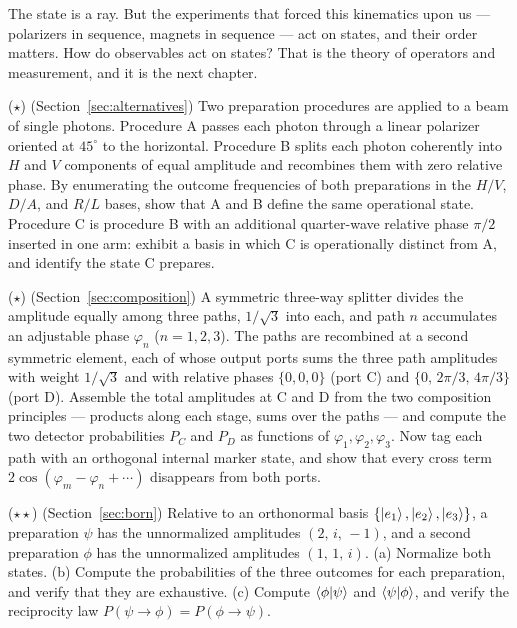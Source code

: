 The state is a ray. But the experiments that forced this kinematics upon us --- polarizers in sequence, magnets in sequence --- act on states, and their order matters. How do observables act on states? That is the theory of operators and measurement, and it is the next chapter.

\begin{problemset}
\item ($\star$) (Section~\ref{sec:alternatives}) Two preparation procedures are applied to a beam of single photons. Procedure A passes each photon through a linear polarizer oriented at $45^{\circ}$ to the horizontal. Procedure B splits each photon coherently into $H$ and $V$ components of equal amplitude and recombines them with zero relative phase. By enumerating the outcome frequencies of both preparations in the $H/V$, $D/A$, and $R/L$ bases, show that A and B define the same operational state. Procedure C is procedure B with an additional quarter-wave relative phase $\pi/2$ inserted in one arm: exhibit a basis in which C is operationally distinct from A, and identify the state C prepares.

\item ($\star$) (Section~\ref{sec:composition}) A symmetric three-way splitter divides the amplitude equally among three paths, $1/\sqrt{3}$ into each, and path $n$ accumulates an adjustable phase $\varphi_n$ ($n=1,2,3$). The paths are recombined at a second symmetric element, each of whose output ports sums the three path amplitudes with weight $1/\sqrt{3}$ and with relative phases $\{0,0,0\}$ (port C) and $\{0,\,2\pi/3,\,4\pi/3\}$ (port D). Assemble the total amplitudes at C and D from the two composition principles --- products along each stage, sums over the paths --- and compute the two detector probabilities $P_C$ and $P_D$ as functions of $\varphi_1,\varphi_2,\varphi_3$. Now tag each path with an orthogonal internal marker state, and show that every cross term $2\cos(\varphi_m-\varphi_n+\cdots)$ disappears from both ports.

\item ($\star\star$) (Section~\ref{sec:born}) Relative to an orthonormal basis $\{\ket{e_1},\ket{e_2},\ket{e_3}\}$, a preparation $\psi$ has the unnormalized amplitudes $(2,\,i,\,-1)$, and a second preparation $\phi$ has the unnormalized amplitudes $(1,\,1,\,i)$. (a) Normalize both states. (b) Compute the probabilities of the three outcomes for each preparation, and verify that they are exhaustive. (c) Compute $\braket{\phi|\psi}$ and $\braket{\psi|\phi}$, and verify the reciprocity law $P(\psi\to\phi)=P(\phi\to\psi)$.


\end{problemset}
